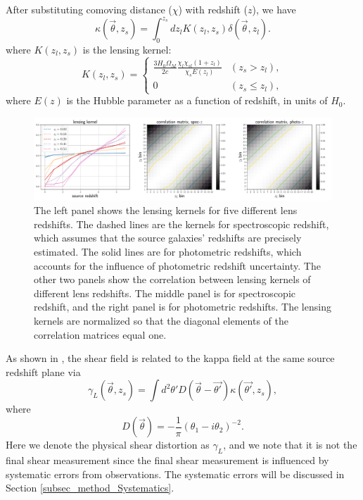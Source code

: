\documentclass[twocolumn]{aastex63}
\begin{document}
After substituting comoving distance ($\chi$) with redshift ($z$), we have
\begin{equation}\label{eq-delta2kappa}
\kappa(\vec{\theta},z_s)=\int_0^{z_s} dz_l K(z_l,z_s)\delta(\vec{\theta},z_l).
\end{equation}
where $K(z_l,z_s)$ is the lensing kernel:
\begin{equation}
K(z_l,z_s) =
\begin{cases}
\frac{3H_0\Omega_M}{2 c} \frac{\chi_l \chi_{sl} (1+z_l)}{\chi_{s} E\left(z_l\right)} & (z_s>z_l),\\
0&(z_s \leq z_l),
\end{cases}
\end{equation}
where $E(z)$ is the Hubble parameter as a function of redshift, in units of $H_0$.

\begin{figure}[!t]
 \centering
 \includegraphics[width=1.\textwidth]{lensing_kernel.pdf}
 \caption{The left panel shows the lensing kernels for five different lens
         redshifts. The dashed lines are the kernels for spectroscopic redshift,
         which assumes that the source galaxies' redshifts are precisely
         estimated. The solid lines are for photometric redshifts, which
         accounts for the influence of photometric redshift uncertainty. The
         other two panels show the correlation between lensing kernels of
         different lens redshifts. The middle panel is for spectroscopic
         redshift, and the right panel is for photometric redshifts. The
         lensing kernels are normalized so that the diagonal elements of the
         correlation matrices equal one.
        }\label{fig_corlensKer}
\end{figure}

As shown in \citet{massMap-KS1993}, the shear field is related to the kappa
field at the same source redshift plane via
\begin{equation}\label{eq-kappa2gamma}
\gamma_L(\vec{\theta},z_s) = \int  d^2 \theta' D(\vec{\theta}-\vec{\theta'}) \kappa(\vec{\theta'},z_s),
\end{equation}
where
\begin{equation}
D(\vec{\theta})=-\frac{1}{\pi}(\theta_1-i\theta_2)^{-2}.
\end{equation}
Here we denote the physical shear distortion as $\gamma_L$, and we note
that it is not the final shear measurement since the final shear
measurement is influenced by systematic errors from observations. The
systematic errors will be discussed in Section \ref{subsec_method_Systematics}.
\end{document}
